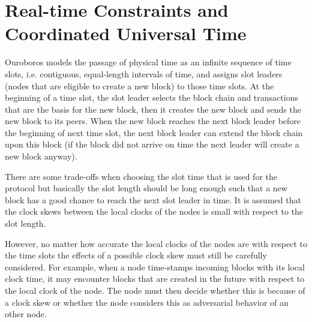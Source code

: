\section{Real-time Constraints and Coordinated Universal Time}
Ouroboros models the passage of physical time as an infinite sequence of time
slots, i.e. contiguous, equal-length intervals of time, and assigns slot
leaders (nodes that are eligible to create a new block) to those time slots.
At the beginning of a time slot, the slot leader selects the block chain and
transactions that are the basis for the new block, then it creates the new
block and sends the new block to its peers.  When the new block reaches the
next block leader before the beginning of next time slot, the next block leader
can extend the block chain upon this block (if the block did not arrive on time
the next leader will create a new block anyway).

There are some trade-offs when choosing the slot time that is used for the
protocol but basically the slot length should be long enough such that a new
block has a good chance to reach the next slot leader in time.  It is assumed
that the clock skews between the local clocks of the nodes is small with
respect to the slot length.

However, no matter how accurate the local clocks of the nodes are with respect
to the time slots the effects of a possible clock skew must still be carefully
considered.  For example, when a node time-stamps incoming blocks with its
local clock time, it may encounter blocks that are created in the future with
respect to the local clock of the node.  The node must then decide whether this
is because of a clock skew or whether the node considers this as adversarial
behavior of an other node.
